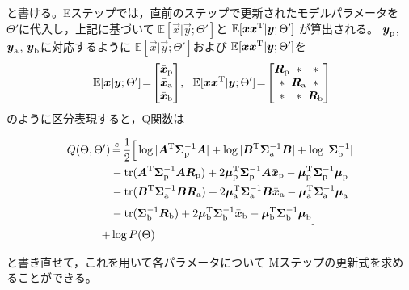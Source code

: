 と書ける。Eステップでは，直前のステップで更新されたモデルパラメータを
$\Theta'$に代入し，上記に基づいて
$\mathbb{E}[\Vec{x}|\Vec{y};\Theta']$と
$\mathbb{E}[\Vec{x}\Vec{x}^{\rm T}|\Vec{y};\Theta']$
が算出される。
$\Vec{y}_{\rm p}$, $\Vec{y}_{\rm a}$, $\Vec{y}_{\rm b}$に対応するように
$\mathbb{E}[\Vec{x}|\Vec{y};\Theta']$および
$\mathbb{E}[\Vec{x}\Vec{x}^{\rm T}|\Vec{y};\Theta']$を
\begin{align}
\mathbb{E}[\Vec{x}|\Vec{y};\Theta']\!=\!
\begin{bmatrix}
\bar{\Vec{x}}_{\rm p}\\
\bar{\Vec{x}}_{\rm a}\\
\bar{\Vec{x}}_{\rm b}
\end{bmatrix}\!,~~
\mathbb{E}[\Vec{x}\Vec{x}^{\rm T}|\Vec{y};\Theta']
\!=\!
\begin{bmatrix}
\Vec{R}_{\rm p}&\hspace{-0.3cm}* &\hspace{-0.3cm}*\\
* &\hspace{-0.3cm}\Vec{R}_{\rm a}&\hspace{-0.3cm}*\\
*&\hspace{-0.3cm}*&\hspace{-0.3cm}\Vec{R}_{\rm b}
\end{bmatrix}\!\!
\end{align}
のように区分表現すると，Q関数は
\begin{small}
\begin{align}
Q({\Theta},{\Theta}')&\mathop{=}^{c}
\frac{1}{2}
\Big[
\log|\Mat{A}^{\rm T}\Mat{\Sigma}_{\rm p}^{-1}\Mat{A}|
+
\log|\Mat{B}^{\rm T}\Mat{\Sigma}_{\rm a}^{-1}\Mat{B}|
+
\log|\Mat{\Sigma}_{\rm b}^{-1}|
\nonumber\\
&-{\rm tr}(\Mat{A}^{\rm T}\Mat{\Sigma}_{\rm p}^{-1}\Mat{A}\Mat{R}_{\rm p})
+2\Vec{\mu}_{\rm p}^{\rm T}\Mat{\Sigma}_{\rm p}^{-1}\Mat{A}\bar{\Vec{x}}_{\rm p}
-\Vec{\mu}_{\rm p}^{\rm T}\Mat{\Sigma}_{\rm p}^{-1}\Vec{\mu}_{\rm p}
\nonumber\\
&-
{\rm tr}(\Mat{B}^{\rm T}\Mat{\Sigma}_{\rm a}^{-1}\Mat{B}\Mat{R}_{\rm a})
+2\Vec{\mu}_{\rm a}^{\rm T}\Mat{\Sigma}_{\rm a}^{-1}\Mat{B}\bar{\Vec{x}}_{\rm a}
-\Vec{\mu}_{\rm a}^{\rm T}\Mat{\Sigma}_{\rm a}^{-1}\Vec{\mu}_{\rm a}
\nonumber\\
&-{\rm tr}(\Vec{\Sigma}_{\rm b}^{-1}\Vec{R}_{\rm b})
+2\Vec{\mu}_{\rm b}^{\rm T}\Mat{\Sigma}_{\rm b}^{-1}\bar{\Vec{x}}_{\rm b}
-\Vec{\mu}_{\rm b}^{\rm T}\Mat{\Sigma}_{\rm b}^{-1}\Vec{\mu}_{\rm b}
\Big]
\nonumber\\
+&\log P(\Theta)
\!\!
\end{align}
\end{small}
と書き直せて，これを用いて各パラメータについて
Mステップの更新式を求めることができる。


